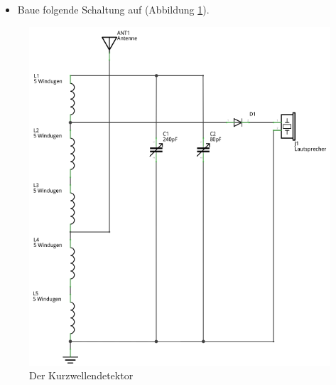 \begin{itemize}
\itemsep1pt\parskip0pt
\item Baue folgende Schaltung auf (Abbildung \ref{kd}). 
\end{itemize}

\begin{figure}[H]
\centering
\includegraphics[scale=1.1]{Kurzwellendetektor/Schaltungen/Kurzwellendetektor_Schaltplan.pdf}
\caption{Der Kurzwellendetektor}
\label{kd}
\end{figure}
